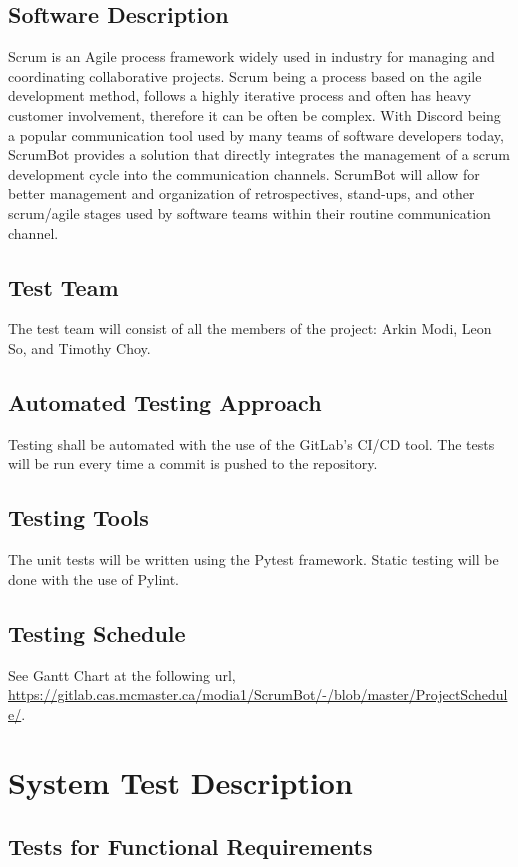 \documentclass[12pt, titlepage]{article}
\begin{document}
\subsection{Software Description}
Scrum is an Agile process framework widely used in industry for managing and coordinating collaborative projects. Scrum being a process based on the agile development method, follows a highly iterative process and often has heavy customer involvement, therefore it can be often be complex. With Discord being a popular communication tool used by many teams of software developers today, ScrumBot provides a solution that directly integrates the management of a scrum development cycle into the communication channels. ScrumBot will allow for better management and organization of retrospectives, stand-ups, and other scrum/agile stages used by software teams within their routine communication channel.

\subsection{Test Team}
The test team will consist of all the members of the project: Arkin Modi, Leon So, and Timothy Choy.

\subsection{Automated Testing Approach}
Testing shall be automated with the use of the GitLab's CI/CD tool. The tests will be run every time a commit is pushed to the repository.

\subsection{Testing Tools}
The unit tests will be written using the Pytest framework. Static testing will be done with the use of Pylint.

\subsection{Testing Schedule}
See Gantt Chart at the following url, \url{https://gitlab.cas.mcmaster.ca/modia1/ScrumBot/-/blob/master/ProjectSchedule/}.

\section{System Test Description}
    
\subsection{Tests for Functional Requirements}
\end{document}
